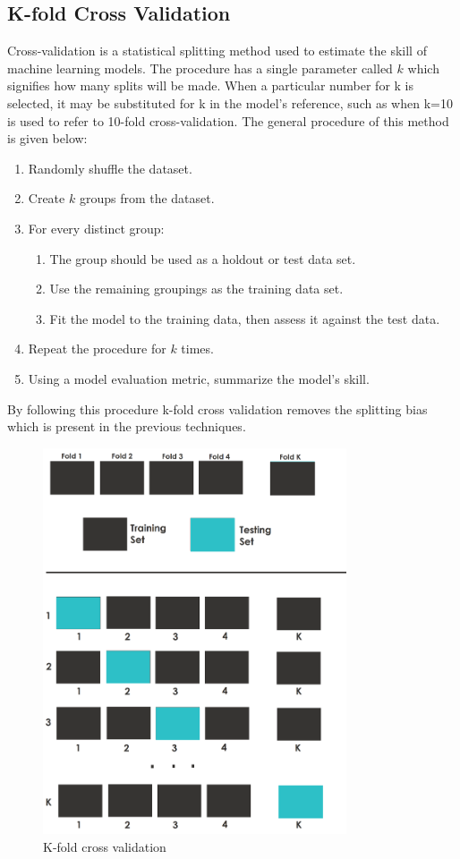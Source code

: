 \subsection{K-fold Cross Validation}
Cross-validation is a statistical splitting method used to estimate the skill of machine learning models. The procedure has a single parameter called $k$ which signifies how many splits will be made. When a particular number for k is selected, it may be substituted for k in the model's reference, such as when k=10 is used to refer to 10-fold cross-validation. 
The general procedure of this method is given below:
\begin{enumerate}
    \item Randomly shuffle the dataset.
    \item Create $k$ groups from the dataset.
    \item For every distinct group:
    \begin{enumerate}
        \item The group should be used as a holdout or test data set.
        \item Use the remaining groupings as the training data set.
        \item Fit the model to the training data, then assess it against the test data.
    \end{enumerate}
    \item Repeat the procedure for $k$ times.
    \item Using a model evaluation metric, summarize the model's skill. 
\end{enumerate}

By following this procedure k-fold cross validation removes the splitting bias which is present in the previous techniques. 

\begin{figure}[H]
\centering
\includegraphics[width=0.8\textwidth]{./figure/chap 5/kfold.png}
\caption{K-fold cross validation}
\label{Fig 5.4}
\end{figure}


